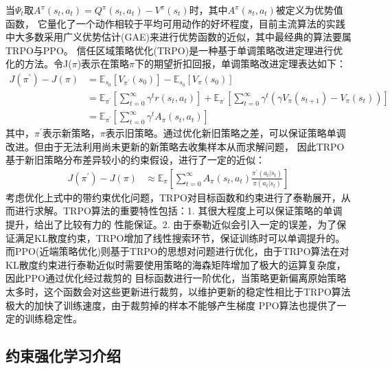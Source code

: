 \begin{itemize}
    当$\Psi_{t}$取$A^{\pi}\left(s_{t}, a_{t}\right)=Q^{\pi}\left(s_{t}, a_{t}\right)-V^{\pi}\left(s_{t}\right)$时，其中$A^{\pi}\left(s_{t}, a_{t}\right)$被定义为优势值函数，
    它量化了一个动作相较于平均可用动作的好坏程度，目前主流算法的实践中大多数采用广义优势估计(GAE)来进行优势函数的近似，其中最经典的算法要属TRPO与PPO。
    信任区域策略优化(TRPO)是一种基于单调策略改进定理进行优化的方法。令J($\pi$)表示在策略$\pi$下的期望折扣回报，单调策略改进定理表达如下：
    \begin{align}
        J\left(\pi^{\prime}\right)-J(\pi) & =\mathbb{E}_{s_{0}}\left[V_{\pi^{\prime}}\left(s_{0}\right)\right]-\mathbb{E}_{s_{0}}\left[V_{\pi}\left(s_{0}\right)\right] \\
        & =\mathbb{E}_{\pi^{\prime}}\left[\sum_{t=0}^{\infty} \gamma^{t} r\left(s_{t}, a_{t}\right)\right]+\mathbb{E}_{\pi^{\prime}}\left[\sum_{t=0}^{\infty} \gamma^{t}\left(\gamma V_{\pi}\left(s_{t+1}\right)-V_{\pi}\left(s_{t}\right)\right)\right] \\
        & = \mathbb{E}_{\pi^{\prime}}\left[\sum_{t=0}^{\infty} \gamma^{t} A_{\pi}\left(s_{t}, a_{t}\right)\right]
    \end{align}
    其中，$\pi^{\prime}$表示新策略，$\pi$表示旧策略。通过优化新旧策略之差，可以保证策略单调改进。但由于无法利用尚未更新的新策略去收集样本从而求解问题，
    因此TRPO基于新旧策略分布差异较小的约束假设，进行了一定的近似：
    \begin{align}
        J\left(\pi^{\prime}\right)-J(\pi)
        & \approx \mathbb{E}_{\pi}\left[\sum_{t=0}^{\infty} A_{\pi}\left(s_{t}, a_{t}\right)\frac{\pi^{\prime}(a_{t}|s_{t})}{\pi(a_{t}|s_{t})} \right]
    \end{align}
    考虑优化上式中的带约束优化问题，TRPO对目标函数和约束进行了泰勒展开，从而进行求解。TRPO算法的重要特性包括：1. 其很大程度上可以保证策略的单调提升，给出了比较有力的
    性能保证。2. 由于泰勒近似会引入一定的误差，为了保证满足KL散度约束，TRPO增加了线性搜索环节，保证训练时可以单调提升的。
    而PPO(近端策略优化)则基于TRPO的思想对问题进行优化，由于TRPO算法在对KL散度约束进行泰勒近似时需要使用策略的海森矩阵增加了极大的运算复杂度，因此PPO通过优化经过裁剪的
    目标函数进行一阶优化，当策略更新偏离原始策略太多时，这个函数会对这些更新进行裁剪，以维护更新的稳定性相比于TRPO算法极大的加快了训练速度，由于裁剪掉的样本不能够产生梯度
    PPO算法也提供了一定的训练稳定性。
\end{itemize}
\subsection{约束强化学习介绍}
